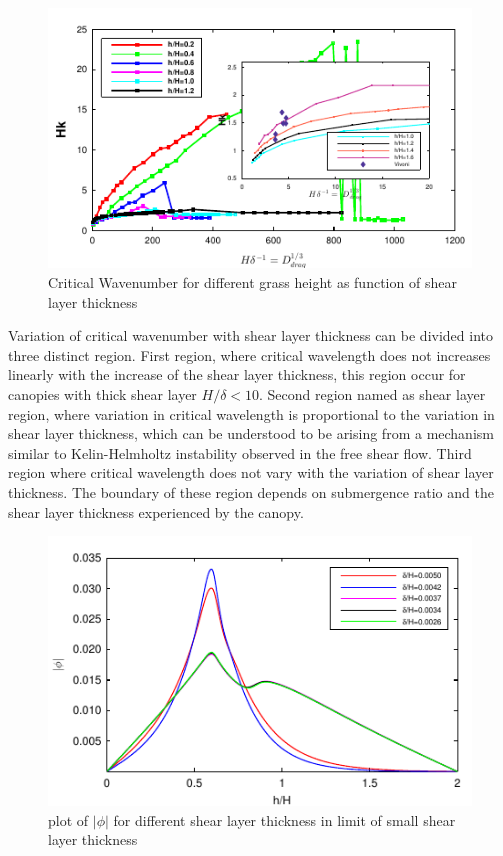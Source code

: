 \documentclass[aps,prl,twocolumn,showpacs,superscriptaddress,groupedaddress,10pt]{revtex4-1}  %
\begin{document}
\begin{figure}[htb]
\includegraphics[]{K_vs_shear_width_noshear}
\caption{Critical Wavenumber for different grass height as function of shear layer thickness}
\label{K_vs_shear}
\end{figure}
Variation of critical wavenumber with shear layer thickness can be divided into three distinct region. First region, where critical wavelength does not increases linearly with the
increase of the shear layer thickness, this region occur for canopies with thick shear layer $H/\delta <10$. Second region named as shear layer region, where variation in critical
wavelength is proportional to the variation in shear layer thickness, which can be understood to be arising from a mechanism similar to Kelin-Helmholtz instability observed in the free
shear flow. Third region where critical wavelength does not vary with the variation of shear layer thickness. The boundary of these region depends on 
submergence ratio and the shear layer thickness experienced by the canopy.
\begin{figure}[]
\includegraphics[]{Asymptotic_eig_set3.pdf}
\caption{plot of $|\phi|$ for different shear layer thickness in limit of small shear layer thickness}
\label{Asymptotic_mode}
\end{figure}
\end{document}
